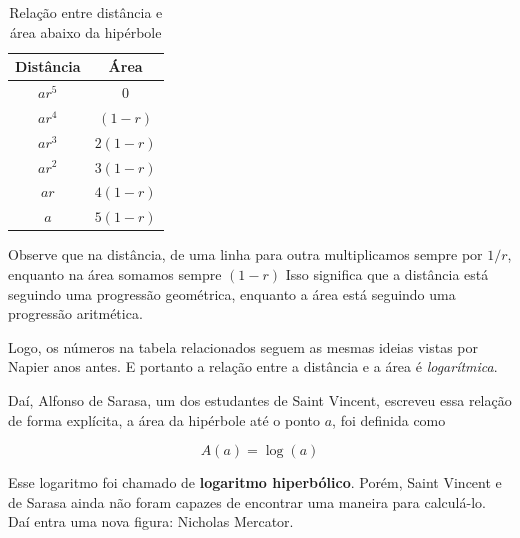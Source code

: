 \begin{table}[h!]
\centering
\begin{tabular}{c c}
\toprule
\textbf{Distância} & \textbf{Área} \\
\midrule
$ar^5$ & $0$ \\
\addlinespace
$ar^4$ & $(1-r)$ \\
\addlinespace
$ar^3$ & $2(1-r)$ \\
\addlinespace
$ar^2$ & $3(1-r)$ \\
\addlinespace
$ar$ & $4(1-r)$ \\
\addlinespace
$a$ & $5(1-r)$ \\
\bottomrule
\end{tabular}
\caption{Relação entre distância e área abaixo da hipérbole}
\label{tab:distarea}
\end{table}

Observe que na distância, de uma linha para outra multiplicamos sempre por $1/r$, enquanto na área somamos sempre $(1-r)$  Isso significa que a distância está seguindo uma progressão geométrica, enquanto a área está seguindo uma progressão aritmética.

Logo, os números na tabela relacionados seguem as mesmas ideias vistas por Napier anos antes. E portanto a relação entre a distância e a área é \textit{logarítmica}.

Daí, Alfonso de Sarasa, um dos estudantes de Saint Vincent, escreveu essa relação de forma explícita, a área da hipérbole até o ponto $a$, foi definida como

\[
A(a) = \log(a)
\]

Esse logaritmo foi chamado de \textbf{logaritmo hiperbólico}. Porém, Saint Vincent e de Sarasa ainda não foram capazes de encontrar uma maneira para calculá-lo. Daí entra uma nova figura: Nicholas Mercator.
